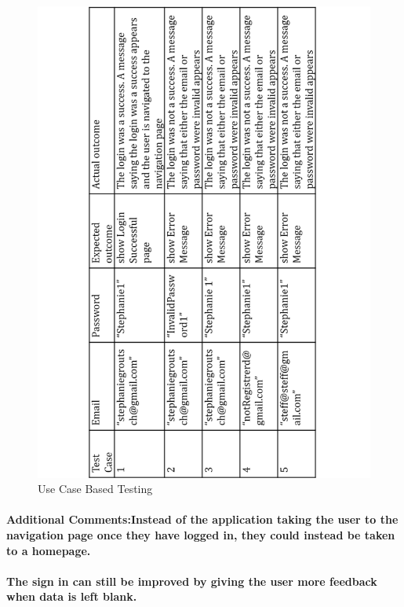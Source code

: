 \documentclass[english]{article}
\begin{document}
\begin{figure}[H]
\centering
\includegraphics[width=1.0\textwidth]{2.3}
\caption{Use Case Based Testing}
\end{figure}
\paragraph{Additional Comments:\newline Instead of the application taking the user to the navigation page once they have logged in, they could instead be taken to a homepage.}

\paragraph{The sign in can still be improved by giving the user more feedback when data is left blank.}
\end{document}
